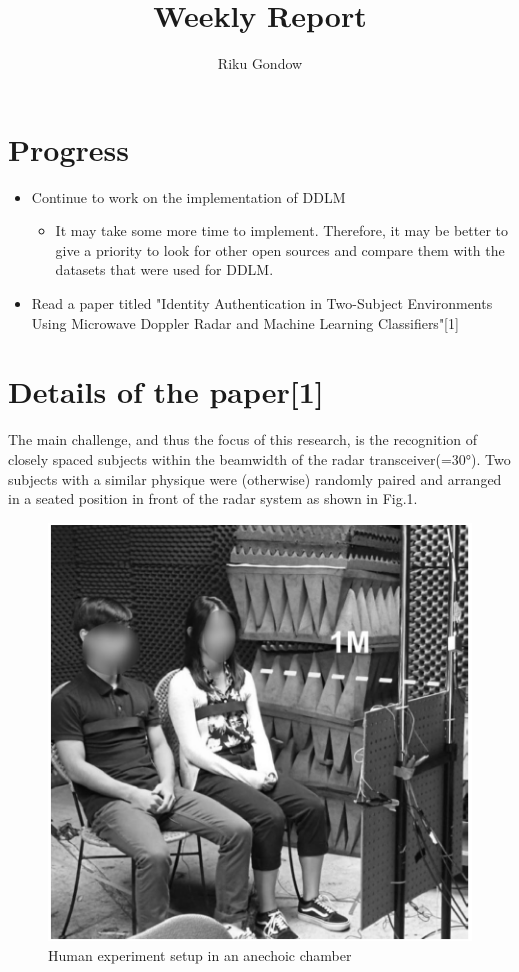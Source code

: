 \documentclass[dvipdfmx]{article}
\begin{document}
\title{Weekly Report}
\author{Riku Gondow}
\maketitle
\section{Progress}
\begin{itemize}
    \item Continue to work on the implementation of DDLM
    \begin{itemize}
        \item It may take some more time to implement. Therefore, it may be better to give a priority to look for other open sources and compare them with the datasets that were used for DDLM.
    \end{itemize}
    \item Read a paper titled "Identity Authentication in Two-Subject Environments Using Microwave Doppler Radar and Machine Learning Classifiers"[1]
\end{itemize}

\section{Details of the paper[1]}

The main challenge, and thus the focus of this research, is the recognition of closely spaced subjects within the beamwidth of the radar transceiver(=30°).
Two subjects with a similar physique were (otherwise) randomly paired and arranged in a seated position in front of the radar system as shown in Fig.1.

\begin{figure}[H]
\begin{center}
\includegraphics[width=0.55\linewidth]{./img/setting_respi.png}
\end{center}
\caption{Human experiment setup in an anechoic chamber}
\end{figure}
\end{document}

